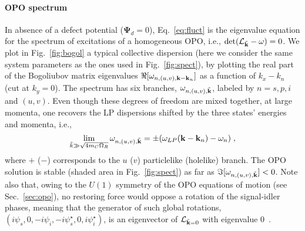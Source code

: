 \paragraph{OPO spectrum}
In absence of a defect potential ($\bm{\Psi}_d =0$),
Eq.~\eqref{eq:fluct} is the eigenvalue equation for the spectrum of
excitations of a homogeneous OPO, i.e.,
$\det(\mathcal{L}_{\tilde{\mathbf{k}}} - \omega)=0$. We plot in
Fig.~\ref{fig:bogol} a typical collective dispersion (here we consider
the same system parameters as the ones used in Fig.~\ref{fig:spect}),
by plotting the real part of the Bogoliubov matrix eigenvalues
$\Re[\omega_{n,(u,v),\mathbf{k}-\mathbf{k}_n}]$ as a function of $k_x - k_n$
(cut at $k_y=0$). The spectrum has six branches,
$\omega_{n,(u,v),\tilde{\mathbf{k}}}$, labeled by $n=s,p,i$ and
$(u,v)$. Even though these degrees of freedom are mixed together, at
large momenta, one recovers the LP dispersions shifted by the three
states' energies and momenta, i.e.,
%
\begin{equation}
  \lim_{\tilde{k} \gg \sqrt{4m_C \Omega_R}} \omega_{n,(u,v),\tilde{\mathbf{k}}} = \pm
  (\omega_{LP}({\mathbf{k} - \mathbf{k}_n}) - \omega_n)\; ,
\label{eq:large}
\end{equation}
%
where $+$ ($-$) corresponds to the $u$ ($v$) particlelike (holelike)
branch.
%
The OPO solution is stable (shaded area in Fig.~\ref{fig:spect}) as
far as $\Im[\omega_{n,(u,v),\tilde{\mathbf{k}}}] < 0$. Note also that,
owing to the $U(1)$ symmetry of the OPO equations of motion (see
Sec.~\ref{sec:opo}), no restoring force would oppose a rotation of the
signal-idler phases, meaning that the generator of such global
rotations,
$(i\psi_s,0,-i\psi_i,-i\psi_{s}^{\star},0,i\psi_{i}^{\star})$, is an
eigenvector of $\mathcal{L}_{\tilde{\mathbf{k}} = 0}$ with eigenvalue
$0$~\cite{Wouters_2007}.

